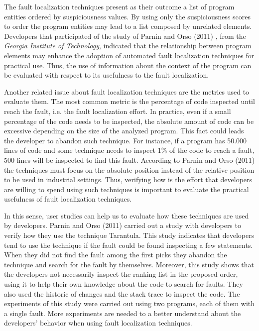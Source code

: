 \documentclass[12pt,a4paper,espaco=umemeio,noindentfirst,oneside,openany,tocpage=plain,pnumromarab,ruledheader,time,anapcustomindent]{sty/abnt}
\begin{document}
The fault localization techniques present as their outcome a list of program entities ordered by suspiciousness values. By using 
only the suspiciousness scores to order the program entities may lead to a list composed by unrelated elements. Developers that 
participated of the study of Parnin and Orso (2011) \cite{parnin2011}, from the \textit{Georgia  Institute of Technology}, indicated that the 
relationship between program elements may enhance the adoption of automated fault localization techniques for practical use.
Thus, the use of information about the context of the program can be evaluated with respect to its usefulness to the fault 
localization.

Another related issue about fault localization techniques are the metrics used to evaluate them. The most common metric is the 
percentage of code inspected until reach the fault, i.e. the fault localization effort. In practice, even if a small percentage 
of the code needs to be inspected, the absolute amount of code can be excessive depending on the size of the analyzed program. This fact 
could leads the developer to abandon such technique. For instance, if a program has 50.000 lines of code and some technique 
needs to inspect 1\% of the code to reach a fault, 500 lines will be inspected to find this fault. According to Parnin and Orso (2011)
\cite{parnin2011} the techniques must focus on the absolute position instead of the relative position to be used in industrial settings.
Thus, verifying how is the effort that developers are willing to spend using such techniques is important to evaluate the practical 
usefulness of fault localization techniques.

In this sense, user studies can help us to evaluate how these techniques are used by developers. Parnin and Orso (2011) \cite{parnin2011} 
carried out a study with developers to verify how they use the technique Tarantula. This study indicates that developers tend to 
use the technique if the fault could be found inspecting a few statements. When they did not find the fault among the first picks 
they abandon the technique and search for the fault by themselves. Moreover, this study shows that the developers not necessarily 
inspect the ranking list in the proposed order, using it to help their own knowledge about the code to search for faults. They also used
the historic of changes and the stack trace to inspect the code.
The experiments of this study were carried out using two programs, each of them with a single fault. More experiments are needed to 
a better understand about the developers' behavior when using fault localization techniques. 
\end{document}
